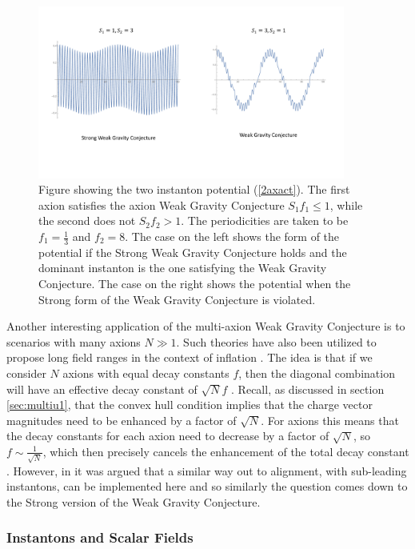 \documentclass[11pt,a4paper]{article}
\numberwithin{equation}{section}
\numberwithin{table}{section}\setlength{\multlinegap}{25pt}
\begin{document}
\begin{figure}[t]
\centering
 \includegraphics[width=0.9\textwidth]{axionrela.pdf}
\caption{Figure showing the two instanton potential (\ref{2axact}). The first axion satisfies the axion Weak Gravity Conjecture $S_1 f_1 \leq 1$, while the second does not $S_2 f_2 > 1$. The periodicities are taken to be $f_1=\frac13$ and $f_2=8$. The case on the left shows the form of the potential if the Strong Weak Gravity Conjecture holds and the dominant instanton is the one satisfying the Weak Gravity Conjecture. The case on the right shows the potential when the Strong form of the Weak Gravity Conjecture is violated.}
\label{fig:axtp}
\end{figure}

Another interesting application of the multi-axion Weak Gravity Conjecture is to scenarios with many axions $N \gg 1$. Such theories have also been utilized to propose long field ranges in the context of inflation \cite{Dimopoulos:2005ac}. The idea is that if we consider $N$ axions with equal decay constants $f$, then the diagonal combination will have an effective decay constant of $\sqrt{N} f$ \cite{Dimopoulos:2005ac}. Recall, as discussed in section \ref{sec:multiu1}, that the convex hull condition implies that the charge vector magnitudes need to be enhanced by a factor of $\sqrt{N}$. For axions this means that the decay constants for each axion need to decrease by a factor of $\sqrt{N}$, so $f \sim \frac{1}{\sqrt{N}}$, which then precisely cancels the enhancement of the total decay constant \cite{Rudelius:2015xta,Montero:2015ofa,Brown:2015iha,Heidenreich:2015wga,Brown:2015lia}. However, in \cite{Bachlechner:2015qja} it was argued that a similar way out to alignment, with sub-leading instantons, can be implemented here and so similarly the question comes down to the Strong version of the Weak Gravity Conjecture. 

\subsubsection*{Instantons and Scalar Fields}
\end{document}
